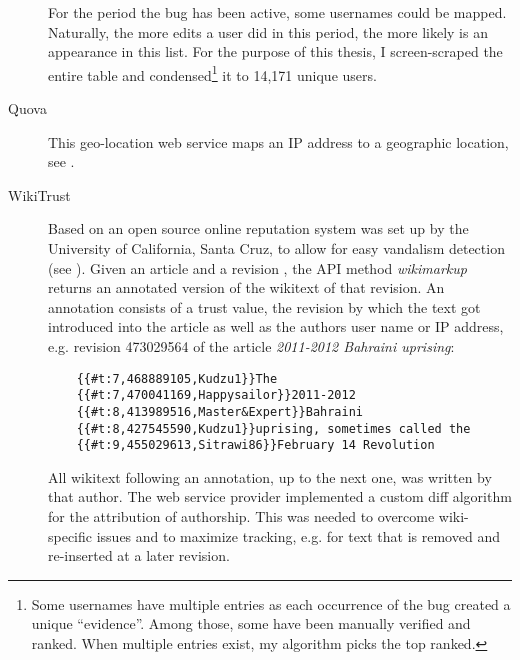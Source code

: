 \begin{description}
For the period the bug has been active, some usernames could be mapped.
Naturally, the more edits a user did in this period, the more likely is an appearance in this list.
For the purpose of this thesis, I screen-scraped the entire table and condensed\footnote{Some usernames have multiple entries as each occurrence of the bug created a unique ``evidence''. Among those, some have been manually verified and ranked. When multiple entries exist, my algorithm picks the top ranked.} it to 14,171 unique users.
\item[Quova] This geo-location web service maps an \ac{IP} address to a geographic location, see .
\item[WikiTrust] Based on \textcite{adler2008assigning} an open source online reputation system was set up by the University of California, Santa Cruz, to allow for easy vandalism detection (see ).
Given an article  and a revision , the \ac{API} method \emph{wikimarkup} returns an annotated version of the wikitext of that revision.
An annotation consists of a trust value, the revision  by which the text got introduced into the article as well as the authors user name or \ac{IP} address, e.g. revision 473029564 of the article \emph{2011-2012 Bahraini uprising}:
\begin{lstlisting}
	{{#t:7,468889105,Kudzu1}}The 
	{{#t:7,470041169,Happysailor}}2011-2012 
	{{#t:8,413989516,Master&Expert}}Bahraini 
	{{#t:8,427545590,Kudzu1}}uprising, sometimes called the
	{{#t:9,455029613,Sitrawi86}}February 14 Revolution 
\end{lstlisting}
All wikitext following an annotation, up to the next one, was written by that author.
The web service provider implemented a custom diff algorithm for the attribution of authorship.
This was needed to overcome wiki-specific issues and to maximize tracking, e.g. for text that is removed and re-inserted at a later revision.
\end{description}


